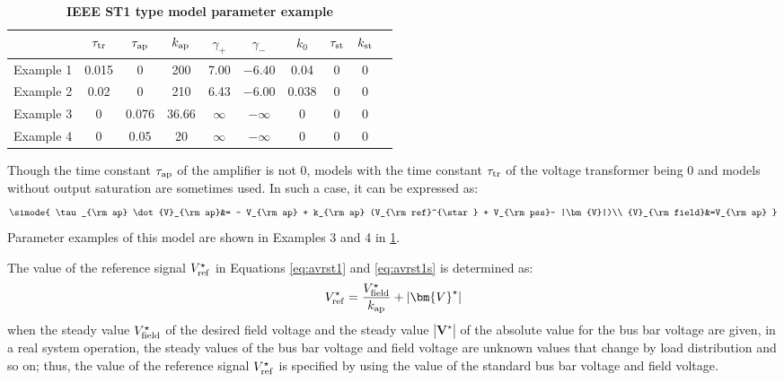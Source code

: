 \documentclass[graybox, envcountchap]{svmult}
\begin{document}
\begin{table}[h]
\medskip
 \caption{\textbf{IEEE ST1 type model parameter example}}
 \label{table:AVRparast1}
 \centering
  \begin{tabular}{lccccccccc}
   \hline
 &  $\tau_{\rm tr}$ & $\tau_{\rm ap}$ & $k_{\rm ap}$ & $\gamma_{+}$ & $\gamma_{-}$ & $k_{0}$ & $\tau_{\rm st}$ & $k_{\rm st}$\\
   \hline \hline
   Example 1 \cite[Section 8.6.3]{kundur1994power}& 0.015 & 0 & 200 & 7.00 & $-6.40$ & 0.04 & 0 & 0\\
   Example 2 \cite[Table H.23]{ieee2016ieee}& 0.02 & 0 & 210 & 6.43 & $-6.00$ & 0.038 & 0 & 0 \\
   Example 3 \cite[Section V]{chow2004power}& 0 & 0.076 & 36.66 & $\infty$ & $-\infty$ & 0 & 0 & 0 \\
   Example 4 \cite[Table 4]{sadamoto2019dynamic}& 0 & 0.05 & 20 & $\infty$ & $-\infty$ & 0 & 0 & 0 \\
   \hline
  \end{tabular}
\end{table}

Though the time constant $\tau_{\rm ap}$ of the amplifier is not 0, models with the time constant $\tau_{\rm tr}$ of the voltage transformer being 0 and models without output saturation are sometimes used.
In such a case, it can be expressed as:
\begin{align}\label{eq:avrst1s}
\simode{
\tau_{\rm ap} \dot{V}_{\rm ap}&=
- V_{\rm ap} + k_{\rm ap} (V_{\rm ref}^{\star} + V_{\rm pss}- |\bm{V}|)\\
{V}_{\rm field}&=V_{\rm ap}
}
\end{align}
Parameter examples of this model are shown in Examples 3 and 4 in \ref{table:AVRparast1}.

The value of the reference signal $V_{{\rm ref}}^{\star}$ in Equations \ref{eq:avrst1} and \ref{eq:avrst1s} is determined as:
\begin{align}\label{eq:avrref}
V_{{\rm ref}}^{\star} = \frac{V_{{\rm field}}^{\star}}{k_{{\rm ap}}}+|\bm{V}^{\star}|
\end{align}
when the steady value $V_{{\rm field}}^{\star}$ of the desired field voltage and the steady value $|\bm{V}^{\star}|$ of the absolute value for the bus bar voltage are given, in a real system operation, the steady values of the bus bar voltage and field voltage are unknown values that change by load distribution and so on;
thus, the value of the reference signal $V_{{\rm ref}}^{\star}$ is specified by using the value of the standard bus bar voltage and field voltage.
\end{document}
